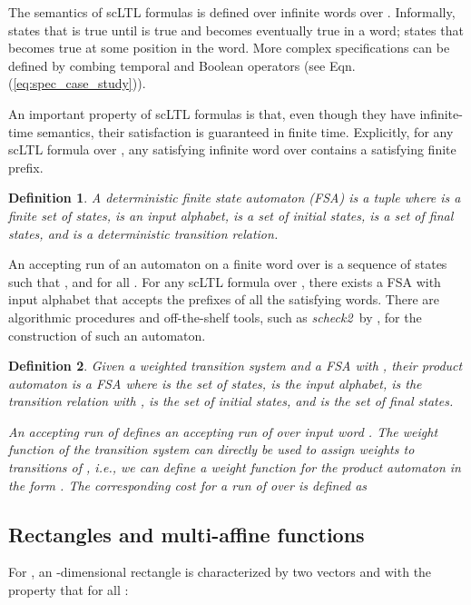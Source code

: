 \documentclass{ifacconf}
\newtheorem{definition}{Definition}
\newcommand{\scheck}{\textit{scheck2\ }}
\begin{document}
The semantics of scLTL formulas is defined over infinite words over . Informally, 
 states that  is true until  is true and  becomes eventually true in a word;  states that  becomes true at some position in the word. More complex specifications can be defined by combing temporal and Boolean operators (see Eqn. (\ref{eq:spec_case_study})). 

An important property of scLTL formulas is that, even though they have infinite-time semantics,
their satisfaction is guaranteed in finite time. Explicitly, for any scLTL formula  over ,
any satisfying infinite word over  contains a satisfying finite prefix. 

\begin{definition} A deterministic finite state automaton (FSA) is a tuple  where  is a finite set of states,  is an input alphabet,  is a set of initial states,  is a set of final states, and  is a deterministic transition relation.
\end{definition}

An accepting run  of an automaton  on a finite word  over  is a sequence of states  such that ,  and  for all . 
For any scLTL  formula over , there exists a FSA  with input alphabet  that accepts the prefixes of all the satisfying words. 
There are algorithmic procedures and off-the-shelf tools, such as \scheck by \cite{Latvala:scheck},
for the construction of such an automaton.

\begin{definition}\label{def:product_automaton}
Given a weighted transition system  and a FSA  with , their product automaton is a FSA  where  is the set of states,  is the input alphabet, 
 is the transition relation with ,
 is the set of initial states, and  is the set of final states.


An accepting run  of  defines an accepting run  of  over input word .
The weight function of the transition system can directly be used to assign weights to transitions of , i.e., we can define a weight function for the product automaton in the form . 
The corresponding cost for a run  of  over  is defined as 
 
\end{definition}
\newcommand{\SIGNLETTER}{\gamma}
\subsection{Rectangles and multi-affine functions}
For , an -dimensional rectangle  is
characterized by two vectors  and  with the property that  for all :
\end{document}
